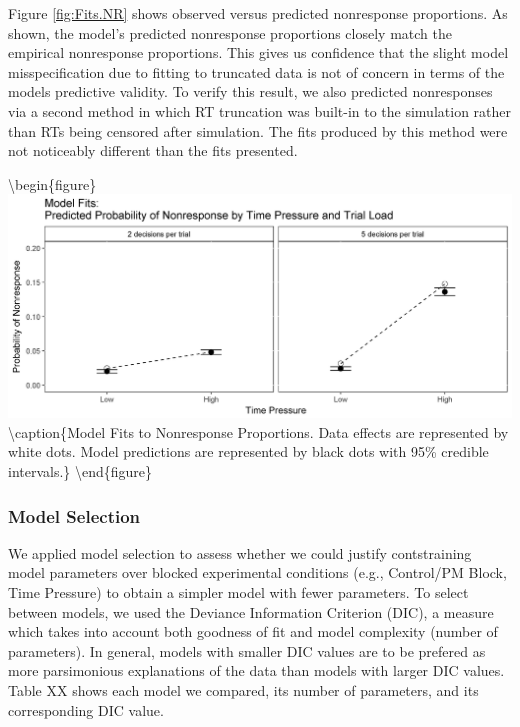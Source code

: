 \documentclass[11pt,]{article}
\begin{document}
Figure \ref{fig:Fits.NR} shows observed versus predicted nonresponse
proportions. As shown, the model's predicted nonresponse proportions
closely match the empirical nonresponse proportions. This gives us
confidence that the slight model misspecification due to fitting to
truncated data is not of concern in terms of the models predictive
validity. To verify this result, we also predicted nonresponses via a
second method in which RT truncation was built-in to the simulation
rather than RTs being censored after simulation. The fits produced by
this method were not noticeably different than the fits presented.

\textbackslash{}begin\{figure\}
\includegraphics[width=0.8\linewidth]{figures/E1/E1.Fits.NR}
\textbackslash{}caption\{\label{fig:Fits.NR}Model Fits to Nonresponse
Proportions. Data effects are represented by white dots. Model
predictions are represented by black dots with 95\% credible
intervals.\}\label{fig:Fit Plot: Nonresponses}
\textbackslash{}end\{figure\}

\subsubsection{Model Selection}\label{model-selection}

We applied model selection to assess whether we could justify
contstraining model parameters over blocked experimental conditions
(e.g., Control/PM Block, Time Pressure) to obtain a simpler model with
fewer parameters. To select between models, we used the Deviance
Information Criterion (DIC), a measure which takes into account both
goodness of fit and model complexity (number of parameters). In general,
models with smaller DIC values are to be prefered as more parsimonious
explanations of the data than models with larger DIC values. Table XX
shows each model we compared, its number of parameters, and its
corresponding DIC value.
\end{document}
